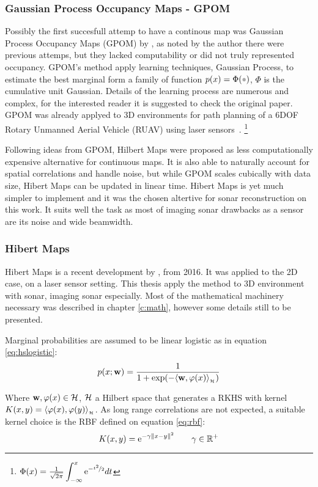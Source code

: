 \subsubsection{Gaussian
Process Occupancy Maps - GPOM}

Possibly the first succesfull attemp to have a continous map was Gaussian
Process Occupancy Maps (GPOM) by \citet{o2012gaussian}, as noted by the author
there were previous attemps, but they lacked computability or did not truly
represented occupancy. GPOM's method apply learning techniques, Gaussian
Process, to estimate the best marginal form a family of function
$p(x)=\Phi(\parm)$, $\Phi$ is the cumulative unit Gaussian. Details of the
learning process are numerous and complex, for the interested reader it is
suggested to check the original paper. GPOM was already applyed to 3D
environments for path planning of a 6DOF Rotary Unmanned Aerial Vehicle (RUAV)
using laser sensors~\cite{gan20093d}. 
\footnote{$\Phi(x)=\frac{1}{\sqrt{2\pi}}\displaystyle\int_{-\infty}^x \mathrm{e}^{-\nicefrac{t^2}{2}}dt$}

Following ideas from GPOM, Hilbert Maps were proposed as less computationally
expensive alternative for continuous maps. It is also able to naturally account
for spatial correlations and handle noise, but while GPOM scales cubically with
data size, Hibert Maps can be updated in linear time. Hibert Maps is yet much
simpler to implement and it was the chosen altertive for sonar reconstruction on
this work. It suits well the task as most of imaging sonar drawbacks as a sensor
are its noise and wide beamwidth.

\subsubsection{Hibert Maps}
\label{sss:hilbertcontinousmap}
Hibert Maps is a recent development by \citet{ramos2016hilbert}, from 2016. It
was applied to the 2D case, on a laser sensor setting. This thesis apply the
method to 3D environment with sonar, imaging sonar especially. Most of the
mathematical machinery necessary was described in chapter \ref{c:math}, however
some details still to be presented.

Marginal probabilities are assumed to be linear logistic as in equation
\ref{eq:hslogistic}:
\begin{equation*}
p(x;\mathrm{\mathbf{w}}) = \frac{1}{1+\exp(-\langle \mathrm{\mathbf{w}},\varphi(x)\rangle_{_{\mathcal{H}}})}
\end{equation*}

Where $\mathrm{\mathbf{w}}, \varphi(x)\in\mathcal{H}$, $\mathcal{H}$ a Hilbert space that generates a RKHS
with kernel $K(x,y)=\langle \varphi(x),\varphi(y)\rangle_{_{\mathcal{H}}}$. As long range correlations
are not expected, a suitable kernel choice is the RBF defined on
equation \ref{eq:rbf}:
\begin{equation*}
K(x,y) = \mathrm{e}^{-\gamma\left\lVert x-y\right\rVert^2} \qquad \gamma \in \mathbb{R}^+
\end{equation*}

